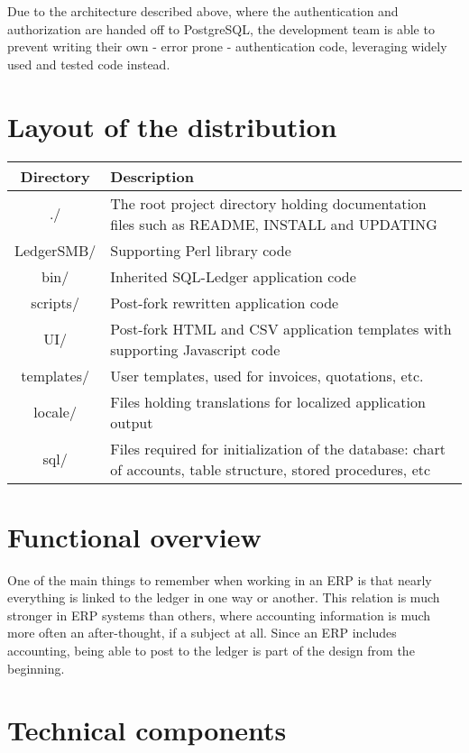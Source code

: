 \documentclass[10pt,A4]{book}
\begin{document}
Due to the architecture described above, where the authentication and authorization
are handed off to PostgreSQL, the development team is able to prevent writing their
own - error prone - authentication code, leveraging widely used and tested code instead.

\section{Layout of the distribution}


\begin{tabular}{|c|p{9cm}|}
\hline Directory &  Description \\
\hline
./ & The root project directory holding documentation files such as
  README, INSTALL and UPDATING  \\ 
LedgerSMB/ & Supporting Perl library code \\
bin/ & Inherited SQL-Ledger application code \\
scripts/ & Post-fork rewritten application code \\
UI/ & Post-fork HTML and CSV application templates with supporting Javascript code \\
templates/ & User templates, used for invoices, quotations, etc. \\
locale/ & Files holding translations for localized application output \\
sql/ & Files required for initialization of the database: chart of accounts,
 table structure, stored procedures, etc \\
\hline 
\end{tabular} 


\section{Functional overview}

One of the main things to remember when working in an ERP is that nearly everything is
linked to the ledger in one way or another.  This relation is much stronger in ERP
systems than others, where accounting information is much more often an after-thought,
if a subject at all.  Since an ERP includes accounting, being able to post to the
ledger is part of the design from the beginning.





\section{Technical components}
\end{document}
